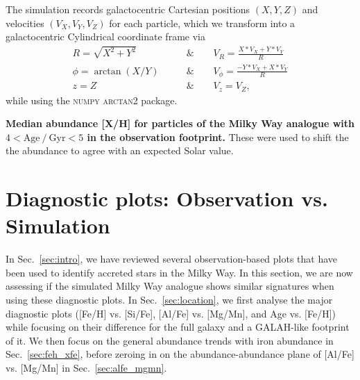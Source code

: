 \documentclass[fleqn,usenatbib]{mnras}
\begin{document}
The simulation records galactocentric Cartesian positions $(X,Y,Z)$ and velocities $(V_X,V_Y,V_Z)$ for each particle, which we transform into a galactocentric Cylindrical coordinate frame via
\begin{align}
    R = \sqrt{X^2 + Y^2} \qquad &\& \qquad V_R = \frac{X*V_X + Y*V_Y}{R} \\
    \phi = \arctan(X/Y) \qquad &\& \qquad V_\phi = \frac{-Y*V_X + X*V_Y}{R} \\
    z = Z  \qquad &\& \qquad V_z = V_Z,
\end{align}
while using the \textsc{numpy} \textsc{arctan2} package.

\begin{table}
    \centering
    \caption{
    \textbf{Median abundance [X/H] for particles of the Milky Way analogue with $4 < \mathrm{Age~/~Gyr} < 5$ in the observation footprint.}
    These were used to shift the the abundance to agree with an expected Solar value.
    }
    
    \label{tab:shift_4to5gyr}
\end{table}


\section{Diagnostic plots: Observation vs. Simulation}
\label{sec:comparison}

In Sec.~\ref{sec:intro}, we have reviewed several observation-based plots that have been used to identify accreted stars in the Milky Way. In this section, we are now assessing if the simulated Milky Way analogue shows similar signatures when using these diagnostic plots. In Sec.~\ref{sec:location}, we first analyse the major diagnostic plots ([Fe/H] vs. [Si/Fe], [Al/Fe] vs. [Mg/Mn], and Age vs. [Fe/H]) while focusing on their difference for the full galaxy and a GALAH-like footprint of it. We then focus on the general abundance trends with iron abundance in Sec.~\ref{sec:feh_xfe}, before zeroing in on the abundance-abundance plane of [Al/Fe] vs. [Mg/Mn] in Sec.~\ref{sec:alfe_mgmn}.
\end{document}

